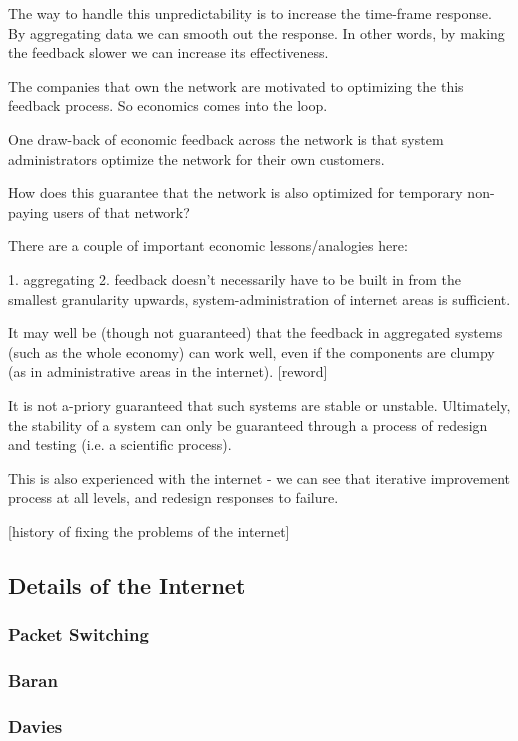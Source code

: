 The way to handle this unpredictability is to increase the time-frame response. By aggregating data
we can smooth out the response. In other words, by making the feedback slower we can increase its
effectiveness.   

The companies that own the network are motivated to optimizing the this feedback process. So
economics comes into the loop.

One draw-back of economic feedback across the network is that system administrators optimize the
network for their own customers.

How does this guarantee that the network is also optimized for temporary non-paying users of that
network?



There are a couple of important economic lessons/analogies here:

1. aggregating    
2. feedback doesn't necessarily have to be built in from the smallest granularity upwards,
   system-administration of internet areas is sufficient.

It may well be (though not guaranteed) that the feedback in aggregated systems (such as the whole
economy) can work well, even if the components are clumpy (as in administrative areas in the
internet). [reword]

It is not a-priory guaranteed that such systems are stable or unstable. Ultimately, the stability of
a system can only be guaranteed through a process of redesign and testing (i.e. a scientific
process).

This is also experienced with the internet - we can see that iterative improvement process at all
levels, and redesign responses to failure.

[history of fixing the problems of the internet]

\subsection{Details of the Internet}


\subsubsection{Packet Switching}

\subsubsection{Baran}
\subsubsection{Davies}


